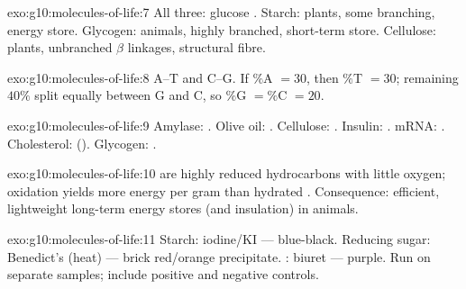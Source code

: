 \begin{solution}{exo:g10:molecules-of-life:7}
All three: glucose . Starch: plants, some branching, energy store.
Glycogen: animals, highly branched, short-term store. Cellulose: plants,
unbranched $\beta$ linkages, structural fibre.
\end{solution}

\begin{solution}{exo:g10:molecules-of-life:8}
A--T and C--G. If $\%$A $= 30$, then $\%$T $= 30$; remaining $40\%$ split
equally between G and C, so $\%$G $= \%$C $= 20$.
\end{solution}

\begin{solution}{exo:g10:molecules-of-life:9}
Amylase: . Olive oil: . Cellulose: . Insulin:
. mRNA: . Cholesterol:  (). Glycogen:
.
\end{solution}

\begin{solution}{exo:g10:molecules-of-life:10}
 are highly reduced hydrocarbons with little oxygen; oxidation yields
more energy per gram than hydrated . Consequence: efficient,
lightweight long-term energy stores (and insulation) in animals.
\end{solution}

\begin{solution}{exo:g10:molecules-of-life:11}
Starch: iodine/KI --- blue-black. Reducing sugar: Benedict's (heat) ---
brick red/orange precipitate. : biuret --- purple. Run on separate
samples; include positive and negative controls.
\end{solution}

